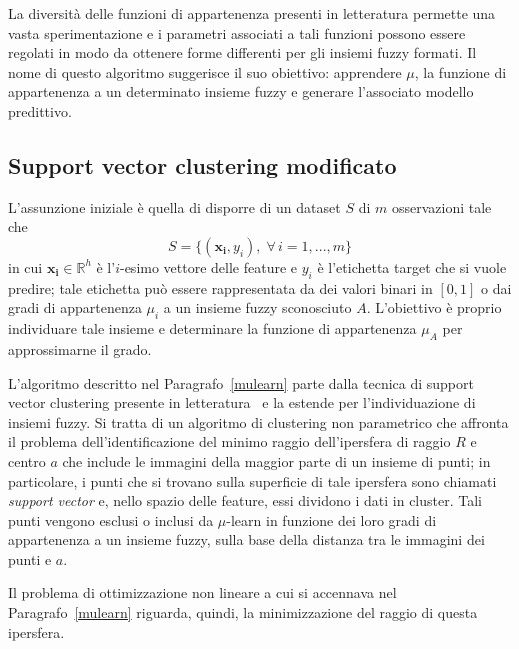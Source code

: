 \documentclass[12pt]{report}
\theoremstyle{definition}
\begin{document}
La diversità delle funzioni di appartenenza presenti in letteratura permette una vasta sperimentazione e i parametri associati a tali funzioni possono essere regolati in modo da ottenere forme differenti per gli insiemi fuzzy formati.
Il nome di questo algoritmo suggerisce il suo obiettivo: apprendere $\mu$, la funzione di appartenenza a un determinato insieme fuzzy e generare l'associato modello predittivo.

\subsection{Support vector clustering modificato}\label{svcmodified}
L'assunzione iniziale è quella di disporre di un dataset $S$ di $m$ osservazioni tale che
\begin{equation}
    S = \{(\mathbf{x_i}, y_i), \; \forall\,i=1, ..., m\}
\end{equation}
in cui $\mathbf{x_i} \in \mathbb{R}^h$ è l'$i$-esimo vettore delle feature e $y_i$ è l'etichetta target che si vuole predire; tale etichetta può essere rappresentata da dei valori binari in $[0,1]$ o dai gradi di appartenenza $\mu_i$ a un insieme fuzzy sconosciuto $A$.
L'obiettivo è proprio individuare tale insieme e determinare la funzione di appartenenza $\mu_A$ per approssimarne il grado.

L'algoritmo descritto nel Paragrafo~\ref{mulearn} parte dalla tecnica di support vector clustering presente in letteratura~\cite{23} e la estende per l'individuazione di insiemi fuzzy. Si tratta di un algoritmo di clustering non parametrico che affronta il problema dell'identificazione del minimo raggio dell'ipersfera di raggio $R$ e centro $a$ che include le immagini della maggior parte di un insieme di punti; in particolare, i punti che si trovano sulla superficie di tale ipersfera sono chiamati \textit{support vector} e, nello spazio delle feature, essi dividono i dati in cluster.
Tali punti vengono esclusi o inclusi da $\mu$-learn in funzione dei loro gradi di appartenenza a un insieme fuzzy, sulla base della distanza tra le immagini dei punti e $a$.

Il problema di ottimizzazione non lineare a cui si accennava nel Paragrafo~\ref{mulearn} riguarda, quindi, la minimizzazione del raggio di questa ipersfera.
\end{document}
